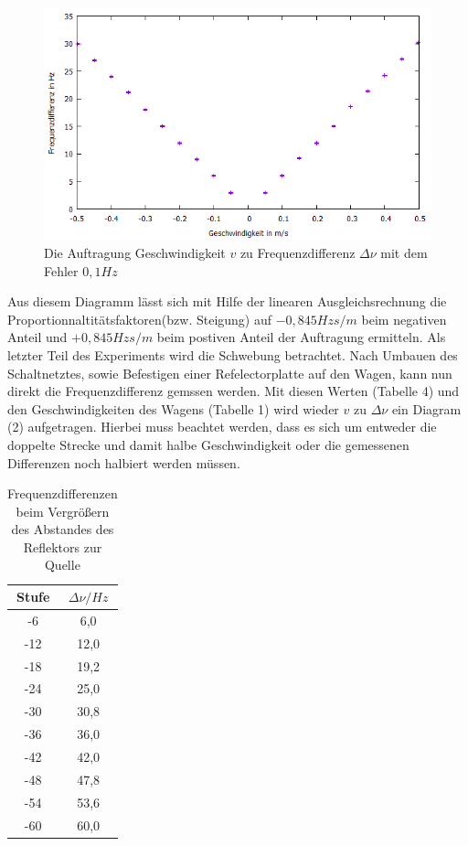 \newpage
\begin{figure}
  \centering
  \includegraphics[width=\textwidth]{diagramD.jpg}
  \caption{Die Auftragung Geschwindigkeit $v$ zu Frequenzdifferenz $\Delta\nu$ mit dem Fehler $0,1 Hz$}
  \label{fig:DiaD}
\end{figure}
Aus diesem Diagramm lässt sich mit Hilfe der linearen Ausgleichsrechnung die Proportionnaltitätsfaktoren(bzw. Steigung)
auf $-0,845 Hz s/m$ beim negativen Anteil und $+0,845 Hz s/m$ beim postiven Anteil der Auftragung ermitteln.
\newpage
Als letzter Teil des Experiments wird die Schwebung betrachtet.
Nach Umbauen des Schaltnetztes, sowie Befestigen einer Refelectorplatte auf den Wagen, kann nun direkt die Frequenzdifferenz gemssen werden.
Mit diesen Werten (Tabelle 4) und den Geschwindigkeiten des Wagens (Tabelle 1) wird wieder $v$ zu $\Delta\nu$ ein Diagram (2) aufgetragen.
Hierbei muss beachtet werden, dass es sich um entweder die doppelte Strecke und damit halbe Geschwindigkeit oder die gemessenen Differenzen noch halbiert werden müssen.
\begin{table}
\centering
 \caption{Frequenzdifferenzen beim Vergrößern des Abstandes des Reflektors zur Quelle}
\label{tab:ref}
\begin{tabular}{ c c }
\toprule
Stufe & $\Delta\nu/Hz$ \\
\midrule
-6 & 6,0\\
-12 & 12,0 \\
-18 & 19,2\\
-24 & 25,0\\
-30 & 30,8\\
-36 & 36,0\\
-42 & 42,0\\
-48 & 47,8\\
-54 & 53,6\\
-60 & 60,0\\
\bottomrule
\end{tabular}
\end{table}
